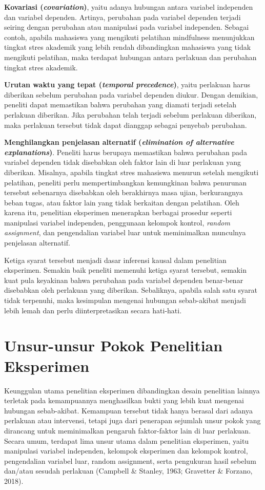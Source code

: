 \documentclass[
  indonesian,
  letterpaper,
  DIV=11,
  numbers=noendperiod]{scrreprt}
\begin{document}
\textbf{Kovariasi (\emph{covariation})}, yaitu adanya hubungan antara
variabel independen dan variabel dependen. Artinya, perubahan pada
variabel dependen terjadi seiring dengan perubahan atau manipulasi pada
variabel independen. Sebagai contoh, apabila mahasiswa yang mengikuti
pelatihan mindfulness menunjukkan tingkat stres akademik yang lebih
rendah dibandingkan mahasiswa yang tidak mengikuti pelatihan, maka
terdapat hubungan antara perlakuan dan perubahan tingkat stres akademik.

\textbf{Urutan waktu yang tepat (\emph{temporal precedence})}, yaitu
perlakuan harus diberikan sebelum perubahan pada variabel dependen
diukur. Dengan demikian, peneliti dapat memastikan bahwa perubahan yang
diamati terjadi setelah perlakuan diberikan. Jika perubahan telah
terjadi sebelum perlakuan diberikan, maka perlakuan tersebut tidak dapat
dianggap sebagai penyebab perubahan.

\textbf{Menghilangkan penjelasan alternatif (\emph{elimination of
alternative explanations})}. Peneliti harus berupaya memastikan bahwa
perubahan pada variabel dependen tidak disebabkan oleh faktor lain di
luar perlakuan yang diberikan. Misalnya, apabila tingkat stres mahasiswa
menurun setelah mengikuti pelatihan, peneliti perlu mempertimbangkan
kemungkinan bahwa penurunan tersebut sebenarnya disebabkan oleh
berakhirnya masa ujian, berkurangnya beban tugas, atau faktor lain yang
tidak berkaitan dengan pelatihan. Oleh karena itu, penelitian eksperimen
menerapkan berbagai prosedur seperti manipulasi variabel independen,
penggunaan kelompok kontrol, \emph{random assignment}, dan pengendalian
variabel luar untuk meminimalkan munculnya penjelasan alternatif.

Ketiga syarat tersebut menjadi dasar inferensi kausal dalam penelitian
eksperimen. Semakin baik peneliti memenuhi ketiga syarat tersebut,
semakin kuat pula keyakinan bahwa perubahan pada variabel dependen
benar-benar disebabkan oleh perlakuan yang diberikan. Sebaliknya,
apabila salah satu syarat tidak terpenuhi, maka kesimpulan mengenai
hubungan sebab-akibat menjadi lebih lemah dan perlu diinterpretasikan
secara hati-hati.

\section{Unsur-unsur Pokok Penelitian
Eksperimen}\label{unsur-unsur-pokok-penelitian-eksperimen}

Keunggulan utama penelitian eksperimen dibandingkan desain penelitian
lainnya terletak pada kemampuannya menghasilkan bukti yang lebih kuat
mengenai hubungan sebab-akibat. Kemampuan tersebut tidak hanya berasal
dari adanya perlakuan atau intervensi, tetapi juga dari penerapan
sejumlah unsur pokok yang dirancang untuk meminimalkan pengaruh
faktor-faktor lain di luar perlakuan. Secara umum, terdapat lima unsur
utama dalam penelitian eksperimen, yaitu manipulasi variabel independen,
kelompok eksperimen dan kelompok kontrol, pengendalian variabel luar,
random assignment, serta pengukuran hasil sebelum dan/atau sesudah
perlakuan (Campbell \& Stanley, 1963; Gravetter \& Forzano, 2018).
\end{document}
